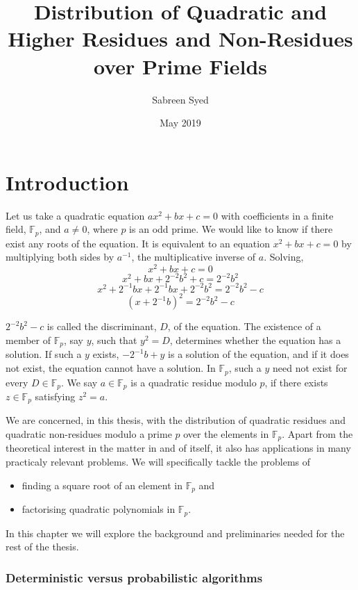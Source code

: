 \documentclass{report}
\title{Distribution of Quadratic and Higher Residues and Non-Residues over Prime Fields}
\author{
  Sabreen Syed\\
  \multicolumn{1}{p{.7\textwidth}}{\centering\emph{Department of Computer Science and Engineering\\
  Indian Institute of Technology Kanpur, India}}}
\date{May 2019}
\begin{document}

\maketitle

\chapter{Introduction}
%
Let us take a quadratic equation $ax^2+bx+c=0$ with coefficients in a finite field, $\mathbb{F}_p$, and $a\neq0$, where $p$ is an odd prime. We would like to know if there exist any roots of the equation. It is equivalent to an equation $x^2+bx+c=0$ by multiplying both sides by $a^{-1}$, the multiplicative inverse of $a$. Solving,
$$x^2+bx+c=0$$
$$x^2+bx+2^{-2}b^{2}+c=2^{-2}b^{2}$$
$$x^2+2^{-1}bx+2^{-1}bx+2^{-2}b^{2}=2^{-2}b^{2}-c$$
$$(x+2^{-1}b)^2=2^{-2}b^{2}-c$$

$2^{-2}b^{2}-c$ is called the discriminant, $D$, of the equation. The existence of a member of $\mathbb{F}_p$, say $y$, such that $y^2=D$, determines whether the equation has a solution. If such a $y$ exists, $-2^{-1}b+y$ is a solution of the equation, and if it does not exist, the equation cannot have a solution. In $\mathbb{F}_p$, such a $y$ need not exist for every $D\in\mathbb{F}_p$. We say $a\in\mathbb{F}_p$ is a quadratic residue modulo $p$, if there exists $z\in \mathbb{F}_p$ satisfying $z^2=a$.

We are concerned, in this thesis, with the distribution of quadratic residues and quadratic non-residues modulo a prime $p$ over the elements in $\mathbb{F}_p$. Apart from the theoretical interest in the matter in and of itself, it also has applications in many practicaly relevant problems. We will specifically tackle the problems of
\begin{itemize}
    \item finding a square root of an element in $\mathbb{F}_p$ and
    \item factorising quadratic polynomials in $\mathbb{F}_p$.
\end{itemize}
In this chapter we will explore the background and preliminaries needed for the rest of the thesis.

\subsection*{Deterministic versus probabilistic algorithms}
\end{document}
